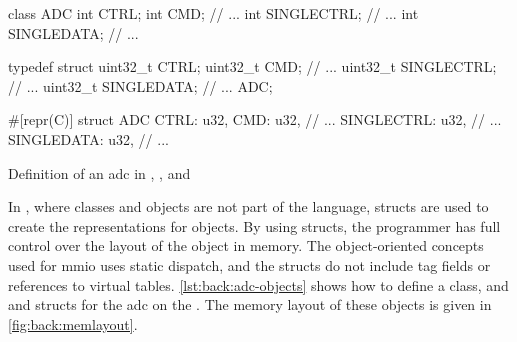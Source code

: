 \begin{listing}[H]
  \centering
  \begin{minipage}{0.26\textwidth}
  \begin{listing}[H]
    \begin{javacode}
class ADC {
  int CTRL;
  int CMD;
  // ...
  int SINGLECTRL;
  // ...
  int SINGLEDATA;
  // ...
}
    \end{javacode}
  \end{listing}
  \end{minipage}
  \hfill
  \begin{minipage}{0.33\textwidth}
  \begin{listing}[H]
    \begin{ccode}
typedef struct {
  uint32_t CTRL;
  uint32_t CMD;
  // ...
  uint32_t SINGLECTRL;
  // ...
  uint32_t SINGLEDATA;
  // ...
} ADC;
    \end{ccode}
  \end{listing}
  \end{minipage}
  \hfill
  \begin{minipage}{0.27\textwidth}
  \begin{listing}[H]
    \begin{rustcode}
#[repr(C)]
struct ADC {
  CTRL: u32,
  CMD: u32,
  // ...
  SINGLECTRL: u32,
  // ...
  SINGLEDATA: u32,
  // ...
}
    \end{rustcode}
  \end{listing}
  \end{minipage}

  \caption{Definition of an \gls{adc} in {\Java}, {\rust}, and {\C}}
  \label{lst:back:adc-objects}
\end{listing}

In {\C}, where classes and objects are not part of the language, structs are used to create the representations for objects.
By using structs, the programmer has full control over the layout of the object in memory.
The object-oriented concepts used for \gls{mmio} uses static dispatch, and the structs do not include tag fields or references to virtual tables.
\autoref{lst:back:adc-objects} shows how to define a {\Java} class, and {\rust} and {\C} structs for the \gls{adc} on the {\gecko}.
The memory layout of these objects is given in \autoref{fig:back:memlayout}.


